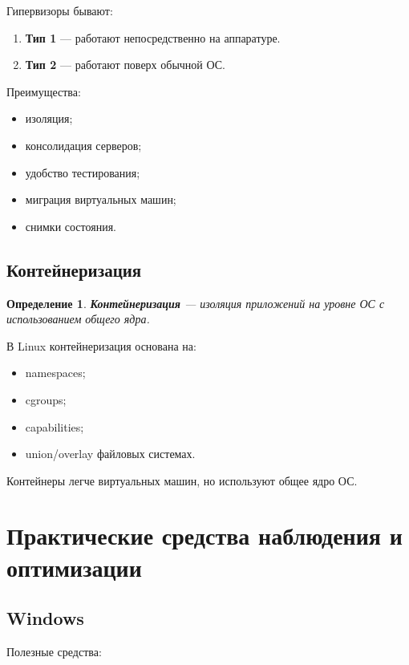 \documentclass[12pt,a4paper]{article}
\newtheorem{definition}{Определение}
\begin{document}
Гипервизоры бывают:

\begin{enumerate}
    \item \textbf{Тип 1} --- работают непосредственно на аппаратуре.
    \item \textbf{Тип 2} --- работают поверх обычной ОС.
\end{enumerate}

Преимущества:

\begin{itemize}
    \item изоляция;
    \item консолидация серверов;
    \item удобство тестирования;
    \item миграция виртуальных машин;
    \item снимки состояния.
\end{itemize}

\subsection{Контейнеризация}

\begin{definition}
\textbf{Контейнеризация} --- изоляция приложений на уровне ОС с использованием общего ядра.
\end{definition}

В Linux контейнеризация основана на:

\begin{itemize}
    \item namespaces;
    \item cgroups;
    \item capabilities;
    \item union/overlay файловых системах.
\end{itemize}

Контейнеры легче виртуальных машин, но используют общее ядро ОС.

\section{Практические средства наблюдения и оптимизации}

\subsection{Windows}

Полезные средства:
\end{document}
